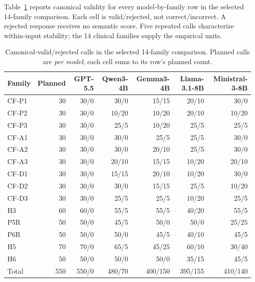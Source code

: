 \documentclass[11pt]{article}
\begin{document}
Table~\ref{tab:family-validity} reports canonical validity for every model-by-family row in the selected 14-family comparison. Each cell is valid/rejected, not correct/incorrect. A rejected response receives no semantic score. Five repeated calls characterize within-input stability; the 14 clinical families supply the empirical units.

\begin{table}[t]
\centering
\footnotesize
\begin{tabular}{@{}lrrrrrr@{}}
\toprule
Family & Planned & GPT-5.5 & Qwen3-4B & Gemma3-4B & Llama-3.1-8B & Ministral-3-8B \\
\midrule
CF-P1 & 30 & 30/0 & 30/0 & 15/15 & 20/10 & 30/0 \\
CF-P2 & 30 & 30/0 & 10/20 & 10/20 & 20/10 & 10/20 \\
CF-P3 & 30 & 30/0 & 25/5 & 10/20 & 25/5 & 25/5 \\
CF-A1 & 30 & 30/0 & 30/0 & 25/5 & 25/5 & 30/0 \\
CF-A2 & 30 & 30/0 & 30/0 & 20/10 & 25/5 & 30/0 \\
CF-A3 & 30 & 30/0 & 20/10 & 15/15 & 10/20 & 20/10 \\
CF-D1 & 30 & 30/0 & 15/15 & 20/10 & 10/20 & 30/0 \\
CF-D2 & 30 & 30/0 & 30/0 & 15/15 & 25/5 & 10/20 \\
CF-D3 & 30 & 30/0 & 25/5 & 25/5 & 10/20 & 25/5 \\
H3    & 60 & 60/0 & 55/5 & 55/5 & 40/20 & 55/5 \\
\midrule
P5R & 50 & 50/0 & 45/5 & 50/0 & 50/0 & 25/25 \\
P6R & 50 & 50/0 & 50/0 & 45/5 & 40/10 & 45/5 \\
H5  & 70 & 70/0 & 65/5 & 45/25 & 60/10 & 30/40 \\
H6  & 50 & 50/0 & 50/0 & 50/0 & 35/15 & 45/5 \\
\midrule
Total & 550 & 550/0 & 480/70 & 400/150 & 395/155 & 410/140 \\
\bottomrule
\end{tabular}
\caption{Canonical-valid/rejected calls in the selected 14-family comparison. Planned calls are \emph{per model}; each cell sums to its row's planned count.}
\label{tab:family-validity}
\end{table}
\end{document}
